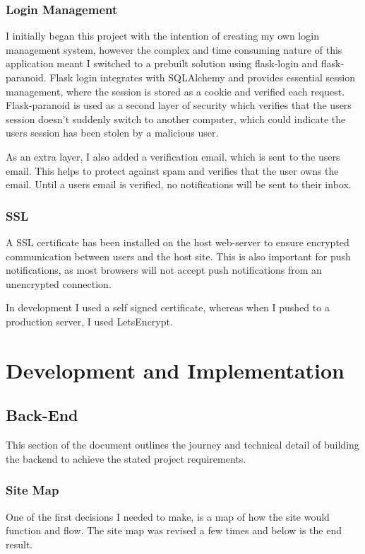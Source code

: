 \documentclass[a4paper,oneside,12pt]{report}
\begin{document}
	\subsection{Login Management}
	I initially began this project with the intention of creating my own login management system, however the complex and time consuming nature of this application meant I switched to a prebuilt solution using flask-login and flask-paranoid. Flask login integrates with SQLAlchemy and provides essential session management, where the session is stored as a cookie and verified each request. Flask-paranoid is used as a second layer of security which verifies that the users session doesn't suddenly switch to another computer, which could indicate the users session has been stolen by a malicious user.

	As an extra layer, I also added a verification email, which is sent to the users email. This helps to protect against spam and verifies that the user owns the email. Until a users email is verified, no notifications will be sent to their inbox.
	
	\subsection{SSL}
	A SSL certificate has been installed on the host web-server to ensure encrypted communication between users and the host site. This is also important for push notifications, as most browsers will not accept push notifications from an unencrypted connection.
	
	In development I used a self signed certificate, whereas when I pushed to a production server, I used LetsEncrypt.
	
	\chapter{Development and Implementation}

	\section{Back-End}
	This section of the document outlines the journey and technical detail of building the backend to achieve the stated project requirements.

	\subsection{Site Map}
	One of the first decisions I needed to make, is a map of how the site would function and flow. The site map was revised a few times and below is the end result.
\end{document}
